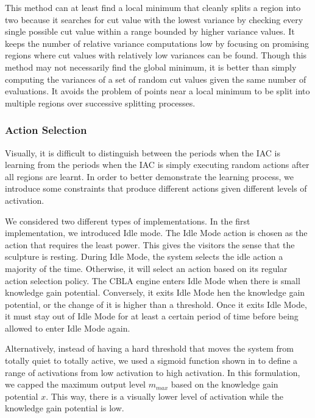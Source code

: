 This method can at least find a local minimum that cleanly splits a region into two because it searches for cut value with the lowest variance by checking every single possible cut value within a range bounded by higher variance values. It keeps the number of relative variance computations low by focusing on promising regions where cut values with relatively low variances can be found. Though this method may not necessarily find the global minimum, it is better than simply computing the variances of a set of random cut values given the same number of evaluations. It avoids the problem of points near a local minimum to be split into multiple regions over successive splitting processes. 

\FloatBarrier 
\subsubsection{Action Selection}\label{sec:action_selection}

Visually, it is difficult to distinguish between the periods when the IAC is learning from the periods when the IAC is simply executing random actions after all regions are learnt. In order to better demonstrate the learning process, we introduce some constraints that produce different actions given different levels of activation. 

We considered two different types of implementations. In the first implementation, we introduced Idle mode. The Idle Mode action is chosen as the action that requires the least power. This gives the visitors the sense that the sculpture is resting. During Idle Mode, the system selects the idle action a majority of the time. Otherwise, it will select an action based on its regular action selection policy. The CBLA engine enters Idle Mode when there is small knowledge gain potential. Conversely, it exits Idle Mode hen the knowledge gain potential, or the change of it is higher than a threshold. Once it exits Idle Mode, it must stay out of Idle Mode for at least a certain period of time before being allowed to enter Idle Mode again. 

Alternatively, instead of having a hard threshold that moves the system from totally quiet to totally active, we used a sigmoid function shown in  to define a range of activations from low activation to high activation. In this formulation, we capped the maximum output level $m_{max}$ based on the knowledge gain potential $x$. This way, there is a visually lower level of activation while the knowledge gain potential is low. 

